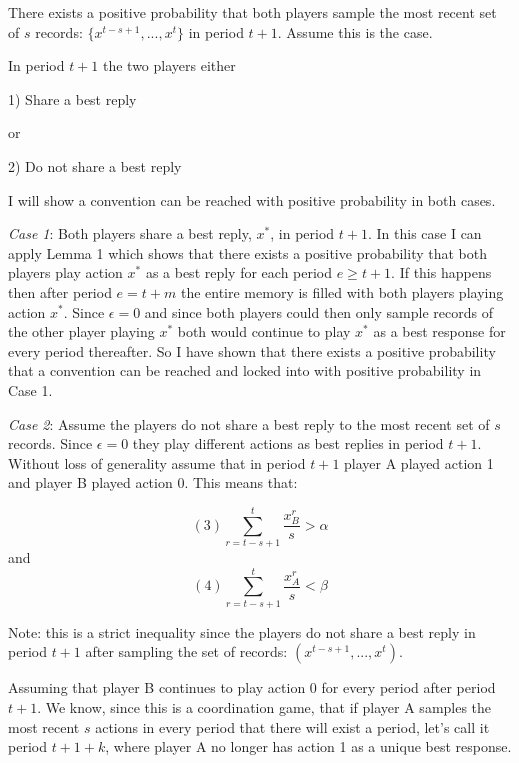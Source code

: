 \documentclass{article}
\begin{document}
\vskip12pt

There exists a positive probability that both players sample the most recent set of $s$ records: $\{x^{t-s+1},...,x^{t}\}$ in period $t+1$. Assume this is the case.

\vskip12pt

In period $t+1$ the two players either

1) Share a best reply

or 

2) Do not share a best reply

I will show a convention can be reached with positive probability in both cases.

\textit{Case 1}: Both players share a best reply, $x^*$, in period $t+1$. In this case I can apply Lemma 1 which shows that there exists a positive probability that both players play action $x^*$ as a best reply for each period $e \geq t+1$. If this happens then after period $e=t+m$ the entire memory is filled with both players playing action $x^*$. Since $\epsilon=0$ and since both players could then only sample records of the other player playing $x^*$ both would continue to play $x^*$ as a best response for every period thereafter. So I have shown that there exists a positive probability that a convention can be reached and locked into with positive probability in Case 1. 

\vskip24pt

\textit{Case 2}: Assume the players do not share a best reply to the most recent set of $s$ records. Since $\epsilon=0$ they play different actions as best replies in period $t+1$. Without loss of generality assume that in period $t+1$ player A played action 1 and player B played action 0. This means that:

$$(3) \sum\limits_{r=t-s+1}^{t} \frac{x^r_B}{s} > \alpha$$
and
$$(4) \sum\limits_{r=t-s+1}^{t} \frac{x^r_A}{s} < \beta$$

Note: this is a strict inequality since the players do not share a best reply in period $t+1$ after sampling the set of records: $(x^{t-s+1},...,x^{t})$.

\vskip12pt

Assuming that player B continues to play action 0 for every period after period $t+1$. We know, since this is a coordination game, that if player A samples the most recent $s$ actions in every period that there will exist a period, let's call it period $t+1+k$, where player A no longer has action 1 as a unique best response.

\vskip12pt
\end{document}
